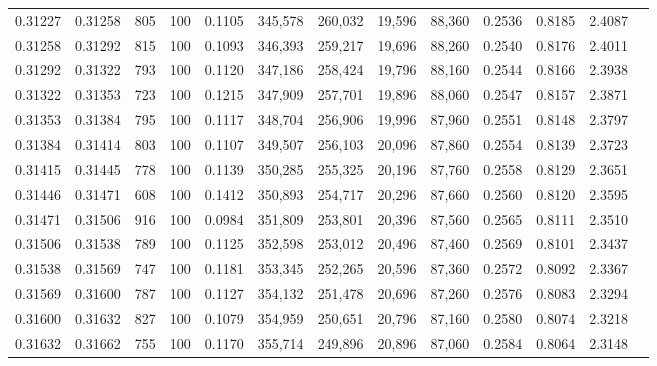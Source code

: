 \begin{tabular}{rrrrrrrrrrrrr}
0.31227 & 0.31258 &    805 & 100 &                                     0.1105 & 345,578 & 260,032 &  19,596 &  88,360 & 0.2536 & 0.8185 & 2.4087 \\
0.31258 & 0.31292 &    815 & 100 &                                     0.1093 & 346,393 & 259,217 &  19,696 &  88,260 & 0.2540 & 0.8176 & 2.4011 \\
0.31292 & 0.31322 &    793 & 100 &                                     0.1120 & 347,186 & 258,424 &  19,796 &  88,160 & 0.2544 & 0.8166 & 2.3938 \\
0.31322 & 0.31353 &    723 & 100 &                                     0.1215 & 347,909 & 257,701 &  19,896 &  88,060 & 0.2547 & 0.8157 & 2.3871 \\
0.31353 & 0.31384 &    795 & 100 &                                     0.1117 & 348,704 & 256,906 &  19,996 &  87,960 & 0.2551 & 0.8148 & 2.3797 \\
0.31384 & 0.31414 &    803 & 100 &                                     0.1107 & 349,507 & 256,103 &  20,096 &  87,860 & 0.2554 & 0.8139 & 2.3723 \\
0.31415 & 0.31445 &    778 & 100 &                                     0.1139 & 350,285 & 255,325 &  20,196 &  87,760 & 0.2558 & 0.8129 & 2.3651 \\
0.31446 & 0.31471 &    608 & 100 &                                     0.1412 & 350,893 & 254,717 &  20,296 &  87,660 & 0.2560 & 0.8120 & 2.3595 \\
0.31471 & 0.31506 &    916 & 100 &                                     0.0984 & 351,809 & 253,801 &  20,396 &  87,560 & 0.2565 & 0.8111 & 2.3510 \\
0.31506 & 0.31538 &    789 & 100 &                                     0.1125 & 352,598 & 253,012 &  20,496 &  87,460 & 0.2569 & 0.8101 & 2.3437 \\
0.31538 & 0.31569 &    747 & 100 &                                     0.1181 & 353,345 & 252,265 &  20,596 &  87,360 & 0.2572 & 0.8092 & 2.3367 \\
0.31569 & 0.31600 &    787 & 100 &                                     0.1127 & 354,132 & 251,478 &  20,696 &  87,260 & 0.2576 & 0.8083 & 2.3294 \\
0.31600 & 0.31632 &    827 & 100 &                                     0.1079 & 354,959 & 250,651 &  20,796 &  87,160 & 0.2580 & 0.8074 & 2.3218 \\
0.31632 & 0.31662 &    755 & 100 &                                     0.1170 & 355,714 & 249,896 &  20,896 &  87,060 & 0.2584 & 0.8064 & 2.3148 \\

\end{tabular}
